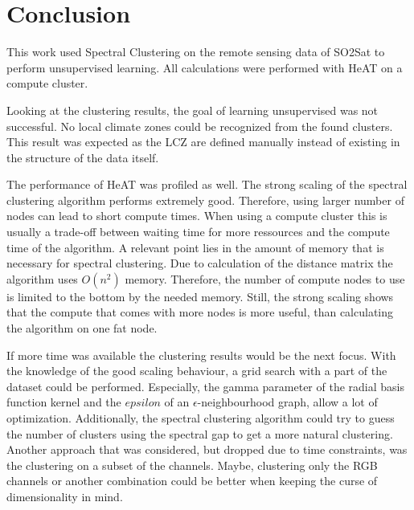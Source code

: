 \section{Conclusion}
\label{sec:conclusion}
This work used Spectral Clustering on the remote sensing data of SO2Sat to perform unsupervised learning.
All calculations were performed with \gls{HeAT} on a compute cluster.

Looking at the clustering results, the goal of learning unsupervised was not successful.
No local climate zones could be recognized from the found clusters.
This result was expected as the \gls{LCZ}  are defined manually instead of existing in the structure of the data itself.

The performance of \gls{HeAT} was profiled as well.
The strong scaling of the spectral clustering algorithm performs extremely good.
Therefore, using larger number of nodes can lead to short compute times.
When using a compute cluster this is usually a trade-off between waiting time for more ressources and the compute time of the algorithm.
A relevant point lies in the amount of memory that is necessary for spectral clustering. Due to calculation of the distance matrix
the algorithm uses \(O(n^2)\) memory.
Therefore, the number of compute nodes to use is limited to the bottom by the needed memory.
Still, the strong scaling shows that the compute that comes with more nodes is more useful, than calculating the algorithm on one fat node.

If more time was available the clustering results would be the next focus.
With the knowledge of the good scaling behaviour, a grid search with a part of the dataset could be performed.
Especially, the gamma parameter of the radial basis function kernel and the \(epsilon\) of an \(\epsilon\)-neighbourhood graph, allow a lot of optimization.
Additionally, the spectral clustering algorithm could try to guess the number of clusters using the spectral gap to get a more natural clustering.
Another approach that was considered, but dropped due to time constraints, was the clustering on a subset of the channels.
Maybe, clustering only the RGB channels or another combination could be better when keeping the curse of dimensionality in mind.
